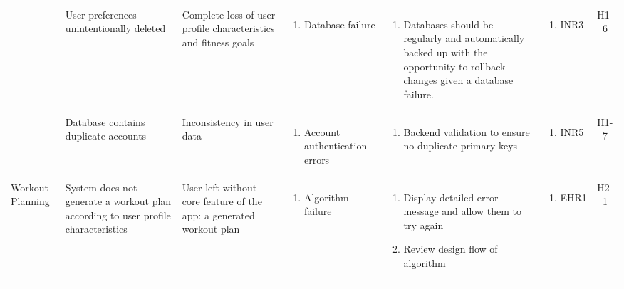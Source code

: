 \documentclass{article}
\begin{document}
\begin{longtable}{|p{1.7cm}|p{1.7cm} p{2.4cm} p{2.4cm} p{3.5cm} p{1.6cm} c|}
  \cline{2-7}
  & User preferences unintentionally deleted & Complete loss of user profile characteristics and fitness goals & \vspace*{-\baselineskip}\begin{enumerate}[label=\alph*., left=0pt, nosep]\item Database failure \end{enumerate} & \vspace*{-\baselineskip}\begin{enumerate}[label=\alph*., left=0pt, nosep]\item Databases should be regularly and automatically backed up with the opportunity to rollback changes given a database failure. \end{enumerate}& \vspace*{-\baselineskip}\begin{enumerate}[label=\alph*., left=0pt, nosep] \item INR3 \end{enumerate} & H1-6\\
  \cline{2-7}
  & Database contains duplicate accounts & Inconsistency in user data & \vspace*{-\baselineskip}\begin{enumerate}[label=\alph*., left=0pt, nosep]\item Account authentication errors \end{enumerate} & \vspace*{-\baselineskip}\begin{enumerate}[label=\alph*., left=0pt, nosep]\item Backend validation to ensure no duplicate primary keys \end{enumerate}& \vspace*{-\baselineskip}\begin{enumerate}[label=\alph*., left=0pt, nosep] \item INR5 \end{enumerate} & H1-7\\
  \hline
  Workout Planning & System does not generate a workout plan according to user profile characteristics & User left without core feature of the app: a generated workout plan & \vspace*{-\baselineskip}\begin{enumerate}[label=\alph*., left=0pt, nosep]\item Algorithm failure \end{enumerate} & \vspace*{-\baselineskip}\begin{enumerate}[label=\alph*., left=0pt, nosep]\item Display detailed error message and allow them to try again \item Review design flow of algorithm  \end{enumerate}& \vspace*{-\baselineskip}\begin{enumerate}[label=\alph*., left=0pt, nosep] \item EHR1 \end{enumerate} & H2-1\\

\end{longtable}
\end{document}
